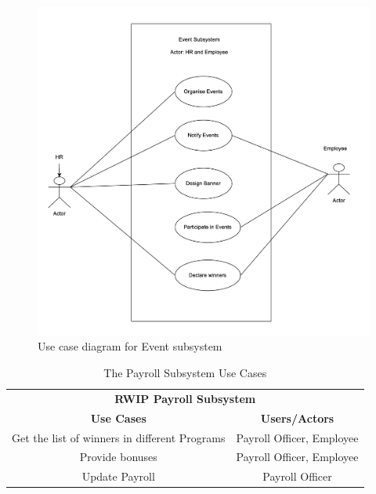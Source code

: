 \begin{figure}[h!t]
    \centering
    \includegraphics[width=\textwidth]{images/ucEvent.png}
    \caption{Use case diagram for Event subsystem}
    \label{fig:ucEvent}
\end{figure}

\begin{table}[h!t]
\caption{The Payroll Subsystem Use Cases}
{%
\newcommand{\mc}[2]{\multicolumn{#1}{#2}}
\begin{center}
\begin{tabular}{|c|c|}
\hline
\multicolumn{2}{|c|}{\textbf{RWIP Payroll Subsystem}} \\ \cline{1-2}
\textbf{Use Cases} & \textbf{Users/Actors} \\
\hline
\rule{0pt}{24pt} Get the list of winners in different Programs & Payroll Officer, Employee\\
\hline
\rule{0pt}{24pt}  Provide bonuses & Payroll Officer, Employee \\
\hline
\rule{0pt}{24pt}  Update Payroll & Payroll Officer \\
\hline
\end{tabular}
\end{center}
}%
\label{tab:payroll}
\end{table}

